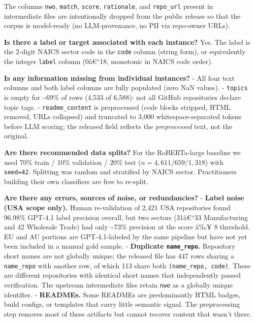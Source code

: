 The columns \texttt{nwo}, \texttt{match}, \texttt{score}, \texttt{rationale}, and \texttt{repo\_url}
present in intermediate files are intentionally dropped from the
public release so that the corpus is model-ready (no LLM-provenance,
no PII via repo-owner URLs).

\textbf{Is there a label or target associated with each instance?}
Yes. The label is the 2-digit NAICS sector code in the \texttt{code} column
(string form), or equivalently the integer \texttt{label} column (0â€``18,
monotonic in NAICS code order).

\textbf{Is any information missing from individual instances?}
- All four text columns and both label columns are fully populated
(zero NaN values).
- \texttt{topics} is empty for \textasciitilde69\% of rows (4,533 of 6,588): not all GitHub
repositories declare topic tags.
- \texttt{readme\_content} is preprocessed (code blocks stripped, HTML
removed, URLs collapsed) and truncated to 3,000 whitespace-separated
tokens before LLM scoring; the released field reflects the
\emph{preprocessed} text, not the original.

\textbf{Are there recommended data splits?}
For the RoBERTa-large baseline we used 70\% train / 10\% validation /
20\% test (\(n = 4{,}611 / 659 / 1{,}318\)) with \texttt{seed=42}. Splitting was
random and stratified by NAICS sector. Practitioners building their
own classifiers are free to re-split.

\textbf{Are there any errors, sources of noise, or redundancies?}
- \textbf{Label noise (USA scope only).} Human re-validation of 2,421
USA repositories found 96.98\% GPT-4.1 label precision overall, but
two sectors (31â€``33 Manufacturing and 42 Wholesale Trade) had only
\textasciitilde73\% precision at the score â‰¥ 8 threshold. EU and AU portions are
GPT-4.1-labeled by the same pipeline but have not yet been included
in a manual gold sample.
- \textbf{Duplicate \texttt{name\_repo}.} Repository short names are not globally
unique; the released file has 447 rows sharing a \texttt{name\_repo} with
another row, of which 113 share both \texttt{(name\_repo,\ code)}. These are
different repositories with identical short names that independently
passed verification. The upstream intermediate files retain \texttt{nwo}
as a globally unique identifier.
- \textbf{READMEs.} Some READMEs are predominantly HTML badges, build
configs, or templates that carry little semantic signal. The
preprocessing step removes most of these artifacts but cannot
recover content that wasn't there.

